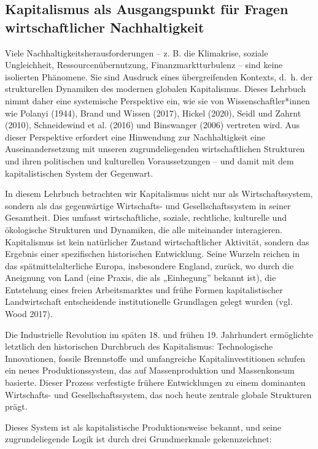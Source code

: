 \documentclass[
  nswissgerman,
  a4paper,
  DIV=11,
  numbers=noendperiod,
  oneside,
  openany]{scrreprt}
\begin{document}
\subsection{Kapitalismus als Ausgangspunkt für Fragen wirtschaftlicher
Nachhaltigkeit}\label{kapitalismus-als-ausgangspunkt-fuxfcr-fragen-wirtschaftlicher-nachhaltigkeit}

Viele Nachhaltigkeitsherausforderungen -- z. B. die Klimakrise, soziale
Ungleichheit, Ressourcenübernutzung, Finanzmarktturbulenz -- sind keine
isolierten Phänomene. Sie sind Ausdruck eines übergreifenden Kontexts,
d.~h. der strukturellen Dynamiken des modernen globalen Kapitalismus.
Dieses Lehrbuch nimmt daher eine systemische Perspektive ein, wie sie
von Wissenschaftler*innen wie Polanyi (1944), Brand und Wissen (2017),
Hickel (2020), Seidl und Zahrnt (2010), Schneidewind et al. (2016) und
Binswanger (2006) vertreten wird. Aus dieser Perspektive erfordert eine
Hinwendung zur Nachhaltigkeit eine Auseinandersetzung mit unseren
zugrundeliegenden wirtschaftlichen Strukturen und ihren politischen und
kulturellen Voraussetzungen -- und damit mit dem kapitalistischen System
der Gegenwart.

In diesem Lehrbuch betrachten wir Kapitalismus nicht nur als
Wirtschaftssystem, sondern als das gegenwärtige Wirtschafts- und
Gesellschaftssystem in seiner Gesamtheit. Dies umfasst wirtschaftliche,
soziale, rechtliche, kulturelle und ökologische Strukturen und
Dynamiken, die alle miteinander interagieren. Kapitalismus ist kein
natürlicher Zustand wirtschaftlicher Aktivität, sondern das Ergebnis
einer spezifischen historischen Entwicklung. Seine Wurzeln reichen in
das spätmittelalterliche Europa, insbesondere England, zurück, wo durch
die Aneignung von Land (eine Praxis, die als „Einhegung'' bekannt ist),
die Entstehung eines freien Arbeitsmarktes und frühe Formen
kapitalistischer Landwirtschaft entscheidende institutionelle Grundlagen
gelegt wurden (vgl. Wood 2017).

Die Industrielle Revolution im späten 18. und frühen 19. Jahrhundert
ermöglichte letztlich den historischen Durchbruch des Kapitalismus:
Technologische Innovationen, fossile Brennstoffe und umfangreiche
Kapitalinvestitionen schufen ein neues Produktionssystem, das auf
Massenproduktion und Massenkonsum basierte. Dieser Prozess verfestigte
frühere Entwicklungen zu einem dominanten Wirtschafts- und
Gesellschaftssystem, das noch heute zentrale globale Strukturen prägt.

Dieses System ist als kapitalistische Produktionsweise bekannt, und
seine zugrundeliegende Logik ist durch drei Grundmerkmale
gekennzeichnet:
\end{document}
